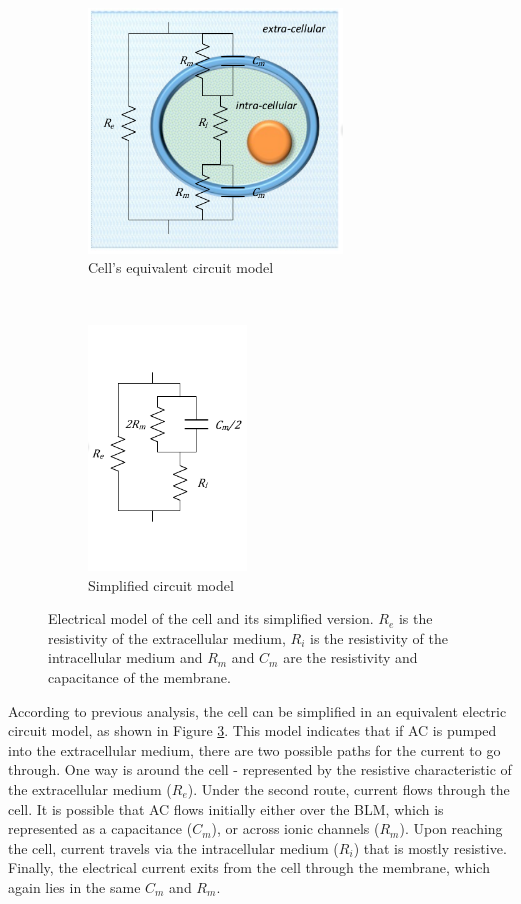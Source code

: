 \begin{figure}[!htbp]
	\centering
	\begin{subfigure}[t]{0.48\textwidth}
		\centering
		\includegraphics[height=6.5cm]{figure2a}
		\caption{Cell's equivalent circuit model}
		\label{fig:cell model}
	\end{subfigure}%
	~ 
	\begin{subfigure}[t]{0.48\textwidth}
		\centering
		\includegraphics[height=6.5cm]{figure2b}
		\caption{Simplified circuit model}
		\label{fig:cell simp model}
	\end{subfigure}
	\caption[Electrical model of the cell]{Electrical model of the cell and its simplified version. $R_e$ is the resistivity of the extracellular medium, $R_i$ is the resistivity of the intracellular medium and $R_m$ and $C_m$ are the resistivity and capacitance of the membrane.}
	\label{fig:cell models}
\end{figure}

According to previous analysis, the cell can be simplified in an equivalent electric circuit model, as shown in Figure \ref{fig:cell models}. This model indicates that if AC is pumped into the extracellular medium, there are two possible paths for the current to go through. One way is around the cell - represented by the resistive characteristic of the extracellular medium ($R_e$). Under the second route, current flows through the cell. It is possible that AC flows initially either over the BLM, which is represented as a capacitance ($C_m$), or across ionic channels ($R_m$). Upon reaching the cell, current travels via the intracellular medium ($R_i$) that is mostly resistive. Finally, the electrical current exits from the cell through the membrane, which again lies in the same $C_m$ and $R_m$.


